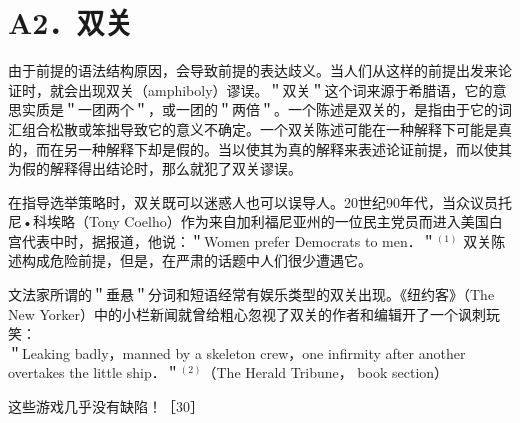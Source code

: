 \section*{A2．双关}
由于前提的语法结构原因，会导致前提的表达歧义。当人们从这样的前提出发来论证时，就会出现双关（amphiboly）谬误。＂双关＂这个词来源于希腊语，它的意思实质是＂一团两个＂，或一团的＂两倍＂。一个陈述是双关的，是指由于它的词汇组合松散或笨拙导致它的意义不确定。一个双关陈述可能在一种解释下可能是真的，而在另一种解释下却是假的。当以使其为真的解释来表述论证前提，而以使其为假的解释得出结论时，那么就犯了双关谬误。

在指导选举策略时，双关既可以迷惑人也可以误导人。20世纪90年代，当众议员托尼•科埃略（Tony Coelho）作为来自加利福尼亚州的一位民主党员而进入美国白宫代表中时，据报道，他说：＂Women prefer Democrats to men．＂${ }^{(1)}$ 双关陈述构成危险前提，但是，在严肃的话题中人们很少遭遇它。

文法家所谓的＂垂悬＂分词和短语经常有娱乐类型的双关出现。《纽约客》（The New Yorker）中的小栏新闻就曾给粗心忽视了双关的作者和编辑开了一个讽刺玩笑：\\
＂Leaking badly，manned by a skeleton crew，one infirmity after another overtakes the little ship．＂${ }^{(2)}$（The Herald Tribune， book section）

这些游戏几乎没有缺陷！［30］

